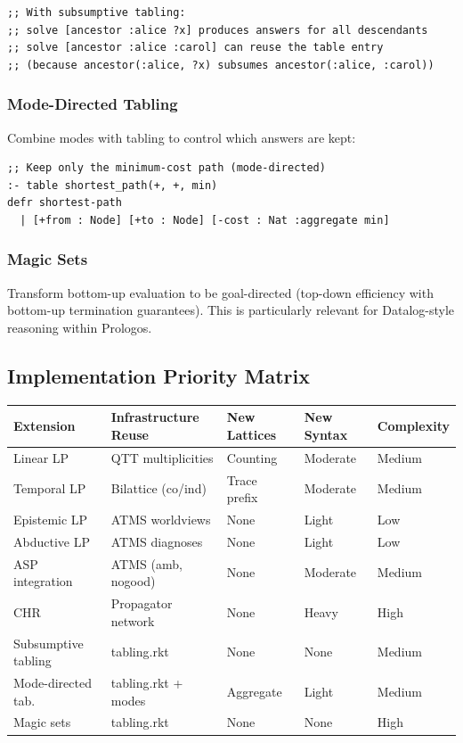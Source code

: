 \documentclass[11pt]{article}
\begin{document}
\begin{verbatim}
;; With subsumptive tabling:
;; solve [ancestor :alice ?x] produces answers for all descendants
;; solve [ancestor :alice :carol] can reuse the table entry
;; (because ancestor(:alice, ?x) subsumes ancestor(:alice, :carol))
\end{verbatim}
\subsubsection{Mode-Directed Tabling}
\label{sec:org0a7f71c}

Combine modes with tabling to control which answers are kept:

\begin{verbatim}
;; Keep only the minimum-cost path (mode-directed)
:- table shortest_path(+, +, min)
defr shortest-path
  | [+from : Node] [+to : Node] [-cost : Nat :aggregate min]
\end{verbatim}
\subsubsection{Magic Sets}
\label{sec:orgb5ad14e}

Transform bottom-up evaluation to be goal-directed (top-down efficiency
with bottom-up termination guarantees). This is particularly relevant for
Datalog-style reasoning within Prologos.
\subsection{Implementation Priority Matrix}
\label{sec:orgd6a5b61}

\begin{center}
\begin{tabular}{lllll}
Extension & Infrastructure Reuse & New Lattices & New Syntax & Complexity\\
\hline
Linear LP & QTT multiplicities & Counting & Moderate & Medium\\
Temporal LP & Bilattice (co/ind) & Trace prefix & Moderate & Medium\\
Epistemic LP & ATMS worldviews & None & Light & Low\\
Abductive LP & ATMS diagnoses & None & Light & Low\\
ASP integration & ATMS (amb, nogood) & None & Moderate & Medium\\
CHR & Propagator network & None & Heavy & High\\
Subsumptive tabling & tabling.rkt & None & None & Medium\\
Mode-directed tab. & tabling.rkt + modes & Aggregate & Light & Medium\\
Magic sets & tabling.rkt & None & None & High\\
\end{tabular}
\end{center}
\end{document}
